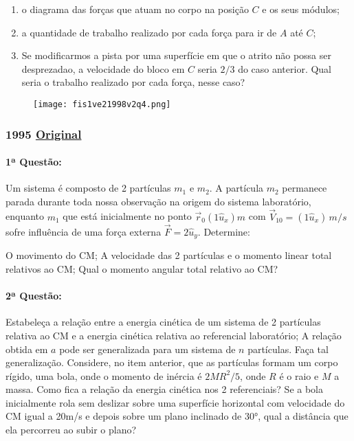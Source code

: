 \documentclass[12pt,a4paper]{article}
\newcommand{\original}[1]{\tiny \href{#1}{Original} \normalsize}
\begin{document}
\begin{enumerate}[label=\alph*)]
\item o diagrama das forças que atuam no corpo na posição $C$ e os seus módulos;
\item a quantidade de trabalho realizado por cada força para ir de $A$ até $C$; 
\item Se modificarmos a pista por uma superfície em que o atrito não possa ser desprezadao, a velocidade do bloco em $C$ 
seria $2/3$ do caso anterior. Qual seria o trabalho realizado por cada força, nesse caso?
\end{enumerate}

\begin{figure}[ht]
\centering
\texttt{[image: fis1ve21998v2q4.png]}
\end{figure}


\newpage
\subsubsection{1995 \original{https://drive.google.com/open?id=1TLNTeFZ-ns7_3GVZ2P8ItPora6HQqNL6}}

\paragraph{1ª Questão:} Um sistema é composto de 2 partículas $m_1$ e $m_2$. A partícula $m_2$ permanece parada durante toda nossa observação na origem do sistema laboratório, enquanto $m_1$ que está inicialmente no ponto $\vec{r}_0(1 \hat{u}_x)m$ com $\vec{V}_{10} = (1\hat{u}_x)\, m/s$ sofre influência de uma força externa $\vec{F} = 2 \hat{u}_y$. Determine:
\begin{tasks}
\task O movimento do CM;
\task A velocidade das 2 partículas e o momento linear total relativos ao CM;
\task Qual o momento angular total relativo ao CM?
\end{tasks}
\vspace{0.7cm}
\paragraph{2ª Questão:}
\begin{tasks}
\task Estabeleça a relação entre a energia cinética de um sistema de 2 partículas relativa ao CM e a energia cinética relativa ao referencial laboratório;
\task A relação obtida em $a$ pode ser generalizada para um sistema de $n$ partículas. Faça tal generalização.
\task Considere, no item anterior, que as partículas formam um corpo rígido, uma bola, onde o momento de inércia é $2MR^2/5$, onde $R$ é o raio e $M$ a massa. Como fica a relação da energia cinética nos 2 referenciais?
\task Se a bola inicialmente rola sem deslizar sobre uma superfície horizontal com velocidade do CM igual a 20m/s e depois sobre um plano inclinado de 30°, qual a distância que ela percorreu ao subir o plano?
\end{tasks}
\newpage
\end{document}
